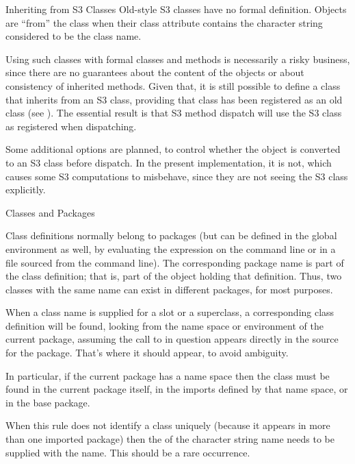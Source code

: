 %
\begin{Section}{Inheriting from S3 Classes}
Old-style S3 classes have no formal definition.  Objects are
``from'' the class when their class attribute contains the
character string considered to be the class name.

Using such classes with formal classes and methods is necessarily a
risky business, since there are no guarantees about the content of the
objects or about consistency of inherited methods.
Given that, it is still possible to define a class that inherits from
an S3 class, providing that class has been registered as an old class
(see ).
The essential result is that S3 method dispatch will use the S3 class
as registered when dispatching.

Some additional options are planned, to control whether the object is
converted to an S3 class before dispatch.  In the present
implementation, it is not, which causes some S3 computations to
misbehave, since they are not seeing the S3 class explicitly.
\end{Section}
%
\begin{Section}{Classes and Packages}

Class definitions normally belong to packages (but can be defined in
the  global environment as well, by evaluating the expression on the
command line or in a file sourced from the command line).
The corresponding package name is part of the class definition; that
is, part of the  object holding that
definition.  Thus, two classes with the same name can exist in
different packages, for most purposes.

When a class name is supplied for a slot or a superclass, a
corresponding class definition will be found, looking from the
name space or environment of the current package, assuming the call to
 in question appears directly in the source for the
package.  That's where it should appear, to avoid ambiguity.

In particular, if the current package has a name space then the  class
must be found in the current package itself, in the imports defined by that
name space, or in the base package.

When this rule does not identify a class uniquely (because it appears
in more than one imported package) then the 
of the character string name needs to be supplied with the name.
This should be a rare occurrence.
\end{Section}
